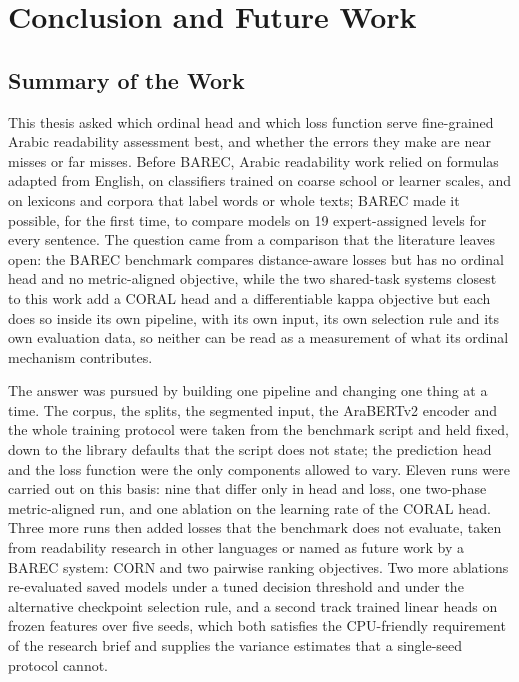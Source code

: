 \chapter{Conclusion and Future Work}
\label{chap:conclusion}

\section{Summary of the Work}

This thesis asked which ordinal head and which loss function serve fine-grained Arabic
readability assessment best, and whether the errors they make are near misses or far misses.
Before BAREC, Arabic readability work relied on formulas adapted from English, on classifiers
trained on coarse school or learner scales, and on lexicons and corpora that label words or whole
texts; BAREC made it possible, for the first time, to compare models on 19 expert-assigned levels
for every sentence. The question came from a comparison that the literature leaves open: the BAREC benchmark
\cite{elmadani2025barec} compares distance-aware losses but has no ordinal head and no
metric-aligned objective, while the two shared-task systems closest to this work add a CORAL
head \cite{nazzal2025zai} and a differentiable kappa objective \cite{trigui2025stbw} but each
does so inside its own pipeline, with its own input, its own selection rule and its own
evaluation data, so neither can be read as a measurement of what its ordinal mechanism
contributes.

The answer was pursued by building one pipeline and changing one thing at a time. The corpus,
the splits, the segmented input, the AraBERTv2 encoder and the whole training protocol were
taken from the benchmark script and held fixed, down to the library defaults that the script
does not state; the prediction head and the loss function were the only components allowed to
vary. Eleven runs were carried out on this basis: nine that differ only in head and loss, one
two-phase metric-aligned run, and one ablation on the learning rate of the CORAL head. Three more
runs then added losses that the benchmark does not evaluate, taken from readability research in
other languages or named as future work by a BAREC system: CORN and two pairwise ranking
objectives. Two more
ablations re-evaluated saved models under a tuned decision threshold and under the alternative
checkpoint selection rule, and a second track trained linear heads on frozen features over five
seeds, which both satisfies the CPU-friendly requirement of the research brief and supplies the
variance estimates that a single-seed protocol cannot.

